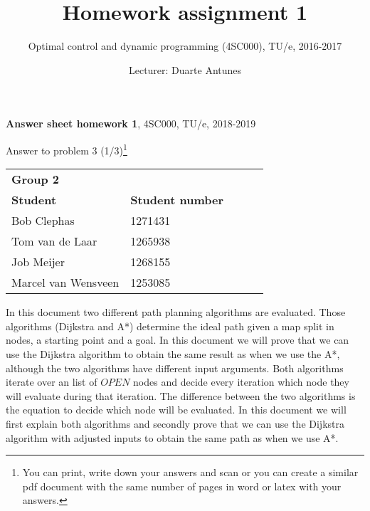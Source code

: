 \documentclass[a4paper]{article}
\title{Homework assignment 1}
\date{Lecturer: Duarte Antunes}
\author{Optimal control and dynamic programming (4SC000), TU/e, 2016-2017}
\begin{document}
	\noindent	\hrulefill
		
\textbf{Answer sheet homework 1}, 4SC000, TU/e, 2018-2019
	\begin{flushright}
		Answer to problem 3 (1/3)\footnote{You can print, write down your answers and scan or you can create a similar pdf document with the same number of pages in word or latex with your answers.}
	\end{flushright}
	\noindent	\hrulefill



\begin{table}[h]
\begin{tabular}{|l|l|lll}
\cline{1-2}
\textbf{Group 2} 	&						  &  &  &  \\ \cline{1-2}
\textbf{Student}    & \textbf{Student number} &  &  &  \\ \cline{1-2}
Bob Clephas         & 1271431                 &  &  &  \\ \cline{1-2}
Tom van de Laar    & 1265938                 &  &  &  \\ \cline{1-2}
Job Meijer          & 1268155                 &  &  &  \\ \cline{1-2}
Marcel van Wensveen & 1253085                 &  &  &  \\ \cline{1-2}
\end{tabular}
\end{table}

In this document two different path planning algorithms are evaluated. Those algorithms (Dijkstra and A*) determine the ideal path given a map split in nodes, a starting point and a goal. In this document we will prove that we can use the Dijkstra algorithm to obtain the same result as when we use the A*, although the two algorithms have different input arguments. Both algorithms iterate over an list of $OPEN$ nodes and decide every iteration which node they will evaluate during that iteration. The difference between the two algorithms is the equation to decide which node will be evaluated. In this document we will first explain both algorithms and secondly prove that we can use the Dijkstra algorithm with adjusted inputs to obtain the same path as when we use A*.
\\
\end{document}
